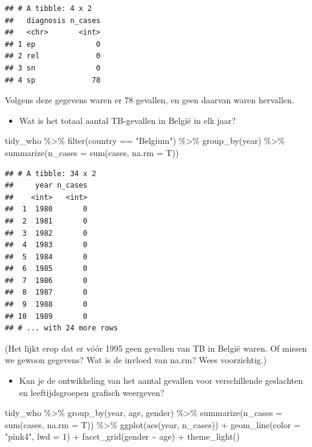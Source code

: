 \documentclass[]{tufte-book}
\newenvironment{Shaded}{}{}
\newcommand{\AttributeTok}[1]{\textcolor[rgb]{0.49,0.56,0.16}{#1}}
\newcommand{\DecValTok}[1]{\textcolor[rgb]{0.25,0.63,0.44}{#1}}
\newcommand{\FunctionTok}[1]{\textcolor[rgb]{0.02,0.16,0.49}{#1}}
\newcommand{\NormalTok}[1]{#1}
\newcommand{\SpecialCharTok}[1]{\textcolor[rgb]{0.25,0.44,0.63}{#1}}
\newcommand{\StringTok}[1]{\textcolor[rgb]{0.25,0.44,0.63}{#1}}
\providecommand{\tightlist}{%
  \setlength{\itemsep}{0pt}\setlength{\parskip}{0pt}}
\begin{document}
\begin{verbatim}
## # A tibble: 4 x 2
##   diagnosis n_cases
##   <chr>       <int>
## 1 ep              0
## 2 rel             0
## 3 sn              0
## 4 sp             78
\end{verbatim}

Volgens deze gegevens waren er 78 gevallen, en geen daarvan waren hervallen.

\begin{itemize}
\tightlist
\item
  Wat is het totaal aantal TB-gevallen in België in elk jaar?
\end{itemize}

\begin{Shaded}
\begin{Highlighting}[]
\NormalTok{tidy\_who }\SpecialCharTok{\%\textgreater{}\%}
  \FunctionTok{filter}\NormalTok{(country }\SpecialCharTok{==} \StringTok{"Belgium"}\NormalTok{) }\SpecialCharTok{\%\textgreater{}\%}
  \FunctionTok{group\_by}\NormalTok{(year) }\SpecialCharTok{\%\textgreater{}\%}
  \FunctionTok{summarize}\NormalTok{(}\AttributeTok{n\_cases =} \FunctionTok{sum}\NormalTok{(cases, }\AttributeTok{na.rm =}\NormalTok{ T))}
\end{Highlighting}
\end{Shaded}

\begin{verbatim}
## # A tibble: 34 x 2
##     year n_cases
##    <int>   <int>
##  1  1980       0
##  2  1981       0
##  3  1982       0
##  4  1983       0
##  5  1984       0
##  6  1985       0
##  7  1986       0
##  8  1987       0
##  9  1988       0
## 10  1989       0
## # ... with 24 more rows
\end{verbatim}

(Het lijkt erop dat er vóór 1995 geen gevallen van TB in België waren. Of missen we gewoon gegevens? Wat is de invloed van na.rm? Wees voorzichtig.)

\begin{itemize}
\tightlist
\item
  Kan je de ontwikkeling van het aantal gevallen voor verschillende geslachten en leeftijdsgroepen grafisch weergeven?
\end{itemize}

\begin{Shaded}
\begin{Highlighting}[]
\NormalTok{tidy\_who }\SpecialCharTok{\%\textgreater{}\%}
  \FunctionTok{group\_by}\NormalTok{(year, age, gender) }\SpecialCharTok{\%\textgreater{}\%}
  \FunctionTok{summarize}\NormalTok{(}\AttributeTok{n\_cases =} \FunctionTok{sum}\NormalTok{(cases, }\AttributeTok{na.rm =}\NormalTok{ T)) }\SpecialCharTok{\%\textgreater{}\%}
  \FunctionTok{ggplot}\NormalTok{(}\FunctionTok{aes}\NormalTok{(year, n\_cases)) }\SpecialCharTok{+}
  \FunctionTok{geom\_line}\NormalTok{(}\AttributeTok{color =} \StringTok{"pink4"}\NormalTok{, }\AttributeTok{lwd =} \DecValTok{1}\NormalTok{) }\SpecialCharTok{+}
  \FunctionTok{facet\_grid}\NormalTok{(gender }\SpecialCharTok{\textasciitilde{}}\NormalTok{ age) }\SpecialCharTok{+}
  \FunctionTok{theme\_light}\NormalTok{()}
\end{Highlighting}
\end{Shaded}
\end{document}
